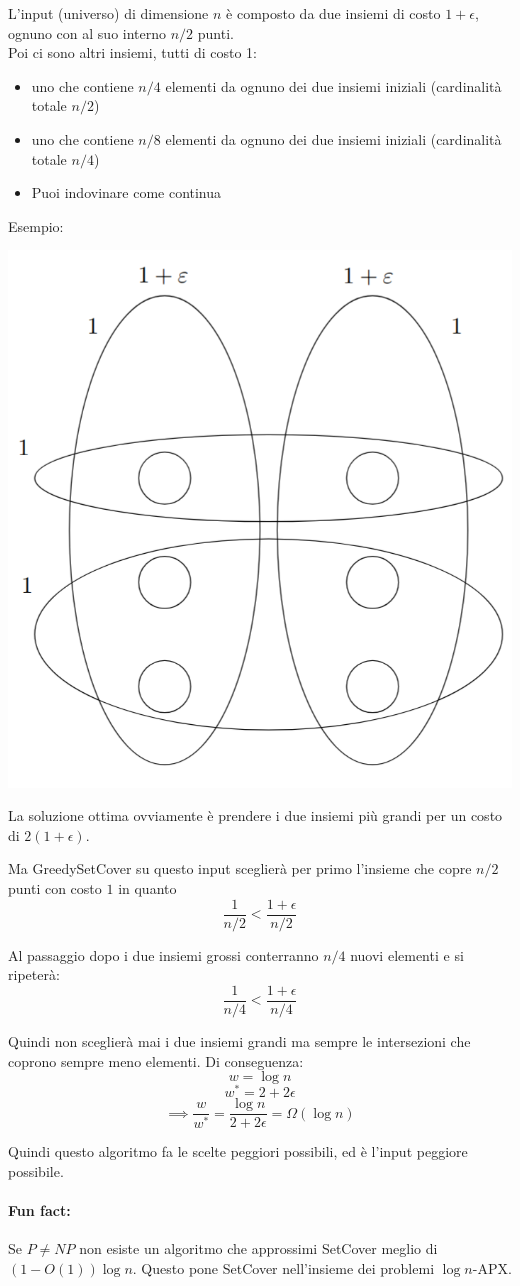 L'input (universo) di dimensione $n$ è composto da due insiemi di costo $1 + \epsilon$, ognuno con al suo interno $n/2$ punti. \\
Poi ci sono altri insiemi, tutti di costo 1:
\begin{itemize}
	\item uno che contiene $n/4$ elementi da ognuno dei due insiemi iniziali (cardinalità totale $n/2$)
	\item uno che contiene $n/8$ elementi da ognuno dei due insiemi iniziali (cardinalità totale $n/4$)
	\item Puoi indovinare come continua
\end{itemize}
Esempio:

\begin{center}
	\includegraphics[width=0.5\columnwidth]{img/VertexCoverInput}
\end{center}

La soluzione ottima ovviamente è prendere i due insiemi più grandi per un costo di $2(1 + \epsilon)$.\\

\newpage

Ma GreedySetCover su questo input sceglierà per primo l'insieme che copre $n/2$ punti con costo $1$ in quanto 
$$ \frac{1}{n/2} < \frac{1+\epsilon}{n/2} $$

Al passaggio dopo i due insiemi grossi conterranno $n/4$ nuovi elementi e si ripeterà:
$$ \frac{1}{n/4} < \frac{1+\epsilon}{n/4} $$

Quindi non sceglierà mai i due insiemi grandi ma sempre le intersezioni che coprono sempre meno elementi. Di conseguenza:
$$ w = \log n $$
$$ w^\ast = 2 + 2 \epsilon$$
$$ \implies \frac{w}{w^\ast} = \frac{\log n}{2 + 2 \epsilon} = \Omega (\log n)$$

Quindi questo algoritmo fa le scelte peggiori possibili, ed è l'input peggiore possibile.\\

\paragraph{Fun fact:} Se $P \neq NP$ non esiste un algoritmo che approssimi SetCover meglio di $(1 - O(1)) \log n$. Questo pone SetCover nell'insieme dei problemi $\log n$-APX.\\

\newpage